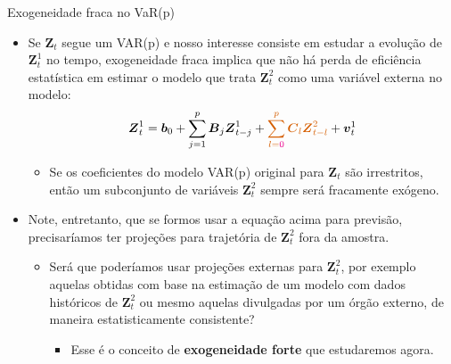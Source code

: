 \documentclass[11pt]{beamer}
\begin{document}
\begin{frame}{Exogeneidade fraca no VaR(p)}
\begin{itemize}
 			\item Se $\boldsymbol{Z}_t$ segue um VAR(p) e nosso interesse consiste em estudar a evolução de $\boldsymbol{Z}^1_t$ no tempo, exogeneidade fraca implica que não há perda de eficiência estatística em estimar o modelo que trata $\boldsymbol{Z}^2_t$ como uma {\color{red}variável externa} no modelo:
	$$\boldsymbol{Z}^1_t = \boldsymbol{b}_0  + \sum_{j=1}^p \boldsymbol{B}_j \boldsymbol{Z}^1_{t-j} + {\color{red}\sum_{l={\color{magenta}0}}^p \boldsymbol{C}_l \boldsymbol{Z}^2_{t-l}} + \boldsymbol{v}^1_t$$
	\begin{itemize}
		\item Se os coeficientes do modelo VAR(p) original para $\boldsymbol{Z}_t$ são irrestritos, então um subconjunto de variáveis $\boldsymbol{Z}^2_t$ sempre será fracamente exógeno.
	\end{itemize}
	\item Note, entretanto, que se formos usar a equação acima para previsão, precisaríamos ter projeções para trajetória de $\boldsymbol{Z}^2_t$ fora da amostra.

	\begin{itemize}
		\item Será que poderíamos usar projeções externas para $\boldsymbol{Z}^2_t$, por exemplo aquelas obtidas com base na estimação de um modelo com dados históricos de  $\boldsymbol{Z}^2_t$  ou mesmo aquelas divulgadas por um órgão externo, de maneira estatisticamente consistente?
		\begin{itemize}
			\item Esse é o conceito de \textbf{exogeneidade forte} que estudaremos agora. 
		\end{itemize}
	\end{itemize}
\end{itemize}
\end{frame}
\end{document}

